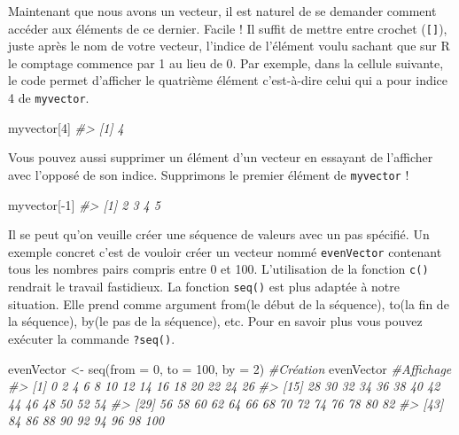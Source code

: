 \documentclass[
]{book}
\newenvironment{Shaded}{\begin{snugshade}}{\end{snugshade}}
\newcommand{\AttributeTok}[1]{\textcolor[rgb]{0.77,0.63,0.00}{#1}}
\newcommand{\CommentTok}[1]{\textcolor[rgb]{0.56,0.35,0.01}{\textit{#1}}}
\newcommand{\DecValTok}[1]{\textcolor[rgb]{0.00,0.00,0.81}{#1}}
\newcommand{\FunctionTok}[1]{\textcolor[rgb]{0.00,0.00,0.00}{#1}}
\newcommand{\NormalTok}[1]{#1}
\newcommand{\OtherTok}[1]{\textcolor[rgb]{0.56,0.35,0.01}{#1}}
\newcommand{\SpecialCharTok}[1]{\textcolor[rgb]{0.00,0.00,0.00}{#1}}
\begin{document}
Maintenant que nous avons un vecteur, il est naturel de se demander comment accéder aux éléments de ce dernier. Facile ! Il suffit de mettre entre crochet (\texttt{{[}{]}}), juste après le nom de votre vecteur, l'indice de l'élément voulu sachant que sur R le comptage commence par 1 au lieu de 0. Par exemple, dans la cellule suivante, le code permet d'afficher le quatrième élément c'est-à-dire celui qui a pour indice 4 de \texttt{myvector}.

\begin{Shaded}
\begin{Highlighting}[]
\NormalTok{myvector[}\DecValTok{4}\NormalTok{]}
\CommentTok{\#\textgreater{} [1] 4}
\end{Highlighting}
\end{Shaded}

Vous pouvez aussi supprimer un élément d'un vecteur en essayant de l'afficher avec l'opposé de son indice. Supprimons le premier élément de \texttt{myvector} !

\begin{Shaded}
\begin{Highlighting}[]
\NormalTok{myvector[}\SpecialCharTok{{-}}\DecValTok{1}\NormalTok{]}
\CommentTok{\#\textgreater{} [1] 2 3 4 5}
\end{Highlighting}
\end{Shaded}

Il se peut qu'on veuille créer une séquence de valeurs avec un pas spécifié. Un exemple concret c'est de vouloir créer un vecteur nommé \texttt{evenVector} contenant tous les nombres pairs compris entre 0 et 100. L'utilisation de la fonction \texttt{c()} rendrait le travail fastidieux. La fonction \texttt{seq()} est plus adaptée à notre situation. Elle prend comme argument from(le début de la séquence), to(la fin de la séquence), by(le pas de la séquence), etc. Pour en savoir plus vous pouvez exécuter la commande \texttt{?seq()}.

\begin{Shaded}
\begin{Highlighting}[]
\NormalTok{evenVector }\OtherTok{\textless{}{-}} \FunctionTok{seq}\NormalTok{(}\AttributeTok{from =} \DecValTok{0}\NormalTok{, }\AttributeTok{to =} \DecValTok{100}\NormalTok{, }\AttributeTok{by =} \DecValTok{2}\NormalTok{) }\CommentTok{\#Création }
\NormalTok{evenVector }\CommentTok{\#Affichage}
\CommentTok{\#\textgreater{}  [1]   0   2   4   6   8  10  12  14  16  18  20  22  24  26}
\CommentTok{\#\textgreater{} [15]  28  30  32  34  36  38  40  42  44  46  48  50  52  54}
\CommentTok{\#\textgreater{} [29]  56  58  60  62  64  66  68  70  72  74  76  78  80  82}
\CommentTok{\#\textgreater{} [43]  84  86  88  90  92  94  96  98 100}
\end{Highlighting}
\end{Shaded}
\end{document}
